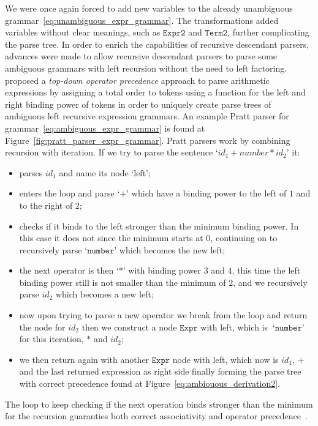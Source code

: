 \documentclass[
  oneside,
  english,
  coorientadorbanca,
  embeddedlogo,
  noabntexcite
]{ufsc-thesis-rn46-2019}
\newcommand{\bnfvars}[1]{\texttt{#1}}
\newcommand{\bnfter}[1]{\ \bnfters{#1}}
\newcommand{\bnfters}[1]{\textrm{`}\texttt{#1}\textrm{'}}
\begin{document}
We were once again forced to add new variables to the already unambiguous grammar~\eqref{eq:unambiguous_expr_grammar}.
The transformations added variables without clear meanings, such as $\bnfvars{Expr2}$ and $\bnfvars{Term2}$, further complicating the parse tree.
In order to enrich the capabilities of recursive descendant parsers, advances were made to allow recursive descendant parsers to parse some ambiguous grammars with left recursion without the need to left factoring.
\textcite{pratt1973operatorprecedence} proposed a \textit{top-down operator precedence} approach to parse arithmetic expressions by assigning a total order to tokens using a function for the left and right binding power of tokens in order to uniquely create parse trees of ambiguous left recursive expression grammars.
An example Pratt parser for grammar~\eqref{eq:ambiguous_expr_grammar} is found at Figure~\ref{fig:pratt_parser_expr_grammar}.
Pratt parsers work by combining recursion with iteration.
If we try to parse the sentence `$id_1 + number * id_2$' it:
\begin{itemize}
  \item parses $id_1$ and name its node `left';
  \item enters the loop and parse $\bnfters{+}$ which have a binding power to the left of $1$ and to the right of $2$;
  \item checks if it binds to the left stronger than the minimum binding power. In this case it does not since the minimum starts at $0$, continuing on to recursively parse $\bnfters{number}$ which becomes the new left;
  \item the next operator is then $\bnfters{*}$ with binding power $3$ and $4$, this time the left binding power still is not smaller than the minimum of $2$, and we recursively parse $id_2$ which becomes a new left;
  \item now upon trying to parse a new operator we break from the loop and return the node for $id_2$ then we construct a node $\bnfvars{Expr}$ with left, which is $\bnfter{number}$ for this iteration, $*$ and $id_2$;
  \item we then return again with another $\bnfvars{Expr}$ node with left, which now is $id_1$, $+$ and the last returned expression as right side finally forming the parse tree with correct precedence found at Figure~\ref{eq:ambiouous_derivation2}.
\end{itemize}
The loop to keep checking if the next operation binds stronger than the minimum for the recursion guaranties both correct associativity and operator precedence~\cite{pratt1973operatorprecedence}.
\end{document}
